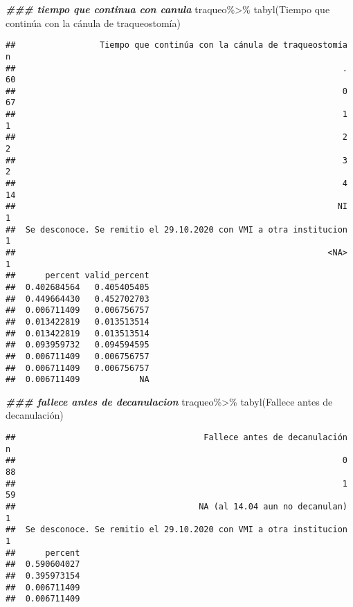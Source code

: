 \documentclass[
]{article}
\newenvironment{Shaded}{\begin{snugshade}}{\end{snugshade}}
\newcommand{\AttributeTok}[1]{\textcolor[rgb]{0.77,0.63,0.00}{#1}}
\newcommand{\DocumentationTok}[1]{\textcolor[rgb]{0.56,0.35,0.01}{\textbf{\textit{#1}}}}
\newcommand{\FunctionTok}[1]{\textcolor[rgb]{0.00,0.00,0.00}{#1}}
\newcommand{\NormalTok}[1]{#1}
\newcommand{\SpecialCharTok}[1]{\textcolor[rgb]{0.00,0.00,0.00}{#1}}
\newcommand{\StringTok}[1]{\textcolor[rgb]{0.31,0.60,0.02}{#1}}
\begin{document}
\begin{Shaded}
\begin{Highlighting}[]
\DocumentationTok{\#\#\# tiempo que continua con canula}
\NormalTok{traqueo}\SpecialCharTok{\%\textgreater{}\%}
  \FunctionTok{tabyl}\NormalTok{(}\StringTok{\textasciigrave{}}\AttributeTok{Tiempo que continúa con la cánula de traqueostomía}\StringTok{\textasciigrave{}}\NormalTok{)}
\end{Highlighting}
\end{Shaded}

\begin{verbatim}
##                 Tiempo que continúa con la cánula de traqueostomía  n
##                                                                  . 60
##                                                                  0 67
##                                                                  1  1
##                                                                  2  2
##                                                                  3  2
##                                                                  4 14
##                                                                 NI  1
##  Se desconoce. Se remitio el 29.10.2020 con VMI a otra institucion  1
##                                                               <NA>  1
##      percent valid_percent
##  0.402684564   0.405405405
##  0.449664430   0.452702703
##  0.006711409   0.006756757
##  0.013422819   0.013513514
##  0.013422819   0.013513514
##  0.093959732   0.094594595
##  0.006711409   0.006756757
##  0.006711409   0.006756757
##  0.006711409            NA
\end{verbatim}

\begin{Shaded}
\begin{Highlighting}[]
\DocumentationTok{\#\#\# fallece antes de decanulacion}
\NormalTok{traqueo}\SpecialCharTok{\%\textgreater{}\%}
  \FunctionTok{tabyl}\NormalTok{(}\StringTok{\textasciigrave{}}\AttributeTok{Fallece antes de decanulación}\StringTok{\textasciigrave{}}\NormalTok{)}
\end{Highlighting}
\end{Shaded}

\begin{verbatim}
##                                      Fallece antes de decanulación  n
##                                                                  0 88
##                                                                  1 59
##                                     NA (al 14.04 aun no decanulan)  1
##  Se desconoce. Se remitio el 29.10.2020 con VMI a otra institucion  1
##      percent
##  0.590604027
##  0.395973154
##  0.006711409
##  0.006711409
\end{verbatim}
\end{document}
